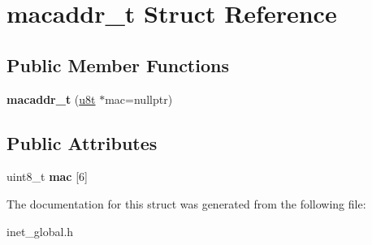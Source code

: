 \hypertarget{structmacaddr__t}{}\section{macaddr\+\_\+t Struct Reference}
\label{structmacaddr__t}
\subsection*{Public Member Functions}
\begin{DoxyCompactItemize}
\item 
\mbox{\label{structmacaddr__t_a442a83a92a78c0a1acacbe36e0471728}} 
{\bfseries macaddr\+\_\+t} (\hyperlink{macros_8h_a176a4ab0531a048e0693a4520c550193}{u8t} $\ast$mac=nullptr)
\end{DoxyCompactItemize}
\subsection*{Public Attributes}
\begin{DoxyCompactItemize}
\item 
\mbox{\label{structmacaddr__t_a3c7dd2e488f6e23119c500482ac3c64a}} 
uint8\+\_\+t {\bfseries mac} \mbox{[}6\mbox{]}
\end{DoxyCompactItemize}


The documentation for this struct was generated from the following file\+:\begin{DoxyCompactItemize}
\item 
inet\+\_\+global.\+h\end{DoxyCompactItemize}
